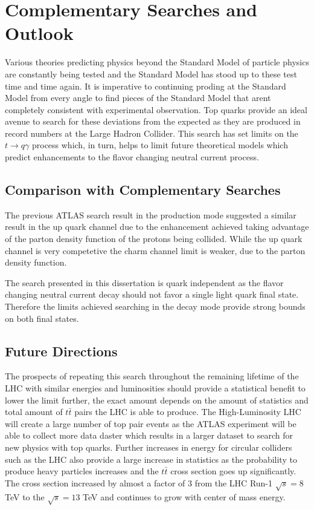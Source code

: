 
\chapter{Complementary Searches and Outlook}
\label{ch:Conclusion}
Various theories predicting physics beyond the Standard Model of particle physics are constantly being tested and the Standard Model has stood up to these test time and time again.  It is imperative to continuing proding at the Standard Model from every angle to find pieces of the Standard Model that arent completely consistent with experimental observation.  Top quarks provide an ideal avenue to search for these deviations from the expected as they are produced in record numbers at the Large Hadron Collider.  This search has set limits on the $t\rightarrow q \gamma$ process which, in turn, helps to limit future theoretical models which predict enhancements to the flavor changing neutral current process.

\section{Comparison with Complementary Searches}

The previous ATLAS search result in the production mode \cite{GregorFCNC} suggested a similar result in the up quark channel due to the enhancement achieved taking advantage of the parton density function of the protons being collided.  While the up quark channel is very competetive the charm channel limit is weaker, due to the parton density function.  

The search presented in this dissertation is quark independent as the flavor changing neutral current decay should not favor a single light quark final state.  Therefore the limits achieved searching in the decay mode provide strong bounds on both final states. 

\section{Future Directions}
The prospects of repeating this search throughout the remaining lifetime of the LHC with similar energies and luminosities should provide a statistical benefit to lower the limit further, the exact amount depends on the amount of statistics and total amount of $t\bar{t}$ pairs the LHC is able to produce.  The High-Luminosity LHC will create a large number of top pair events as the ATLAS experiment will be able to collect more data daster which results in a larger dataset to search for new physics with top quarks.  Further increases in energy for circular colliders such as the LHC also provide a large increase in statistics as the probability to produce heavy particles increases and the $t\bar{t}$ cross section goes up significantly.  The cross section increased by almost a factor of 3 from the LHC Run-1 $\sqrt{s}=8$ TeV to the $\sqrt{s}=13$ TeV and continues to grow with center of mass energy.

